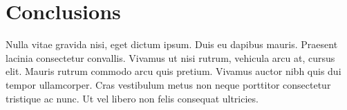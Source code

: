\section{Conclusions}\label{sec:conclusions}
Nulla vitae gravida nisi, eget dictum ipsum.
Duis eu dapibus mauris.
Praesent lacinia consectetur convallis.
Vivamus ut nisi rutrum, vehicula arcu at, cursus elit.
Mauris rutrum commodo arcu quis pretium.
Vivamus auctor nibh quis dui tempor ullamcorper.
Cras vestibulum metus non neque porttitor consectetur tristique ac nunc.
Ut vel libero non felis consequat ultricies.
